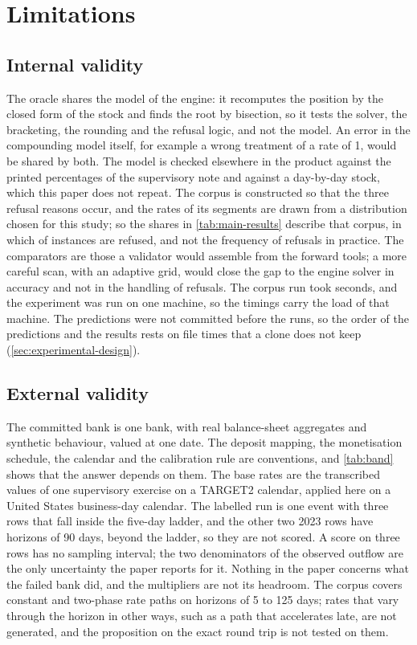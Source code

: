 \section{Limitations}
\label{sec:limitations}

\subsection{Internal validity}

The oracle shares the model of the engine: it recomputes the position by the closed form of the stock and finds the root by bisection, so it tests the solver, the bracketing, the rounding and the refusal logic, and not the model. An error in the compounding model itself, for example a wrong treatment of a rate of 1, would be shared by both. The model is checked elsewhere in the product against the printed percentages of the supervisory note and against a day-by-day stock, which this paper does not repeat. The corpus is constructed so that the three refusal reasons occur, and the rates of its segments are drawn from a distribution chosen for this study; so the shares in \cref{tab:main-results} describe that corpus, in which \kRefused{} of \kInst{} instances are refused, and not the frequency of refusals in practice. The comparators are those a validator would assemble from the forward tools; a more careful scan, with an adaptive grid, would close the gap to the engine solver in accuracy and not in the handling of refusals. The corpus run took \kWallSec{} seconds, and the experiment was run on one machine, so the timings carry the load of that machine. The predictions were not committed before the runs, so the order of the predictions and the results rests on file times that a clone does not keep (\cref{sec:experimental-design}).

\subsection{External validity}

The committed bank is one bank, with real balance-sheet aggregates and synthetic behaviour, valued at one date. The deposit mapping, the monetisation schedule, the calendar and the calibration rule are conventions, and \cref{tab:band} shows that the answer depends on them. The base rates are the transcribed values of one supervisory exercise on a TARGET2 calendar, applied here on a United States business-day calendar. The labelled run is one event with three rows that fall inside the five-day ladder, and the other two 2023 rows have horizons of 90 days, beyond the ladder, so they are not scored. A score on three rows has no sampling interval; the two denominators of the observed outflow are the only uncertainty the paper reports for it. Nothing in the paper concerns what the failed bank did, and the multipliers are not its headroom. The corpus covers constant and two-phase rate paths on horizons of 5 to 125 days; rates that vary through the horizon in other ways, such as a path that accelerates late, are not generated, and the proposition on the exact round trip is not tested on them.

